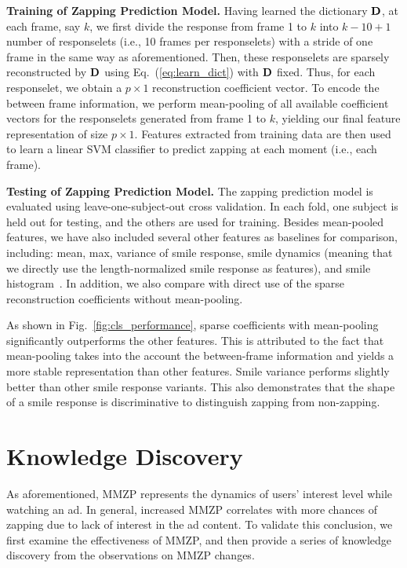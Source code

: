 \documentclass[twoside,leqno,twocolumn]{article}
\begin{document}
\noindent \textbf{Training of Zapping Prediction Model.} Having learned the dictionary ${\bf D}$, at each frame, say $k$, we first divide the response from frame 1 to $k$ into $k-10+1$ number of responselets (i.e., 10 frames per responselets) with a stride of one frame in the same way as aforementioned. Then, these responselets are sparsely reconstructed by ${\bf D}$ using Eq.~(\ref{eq:learn_dict}) with ${\bf D}$ fixed. Thus, for each responselet, we obtain a $p\times 1$ reconstruction coefficient vector. To encode the between frame information, we perform mean-pooling of all available coefficient vectors for the responselets generated from frame 1 to $k$, yielding our final feature representation of size $p\times 1$. Features extracted from training data are then used to learn a linear SVM classifier to predict zapping at each moment (i.e., each frame).

\noindent \textbf{Testing of Zapping Prediction Model.} The zapping prediction model is evaluated using leave-one-subject-out cross validation. In each fold, one subject is held out for testing, and the others are used for training. Besides mean-pooled features, we have also included several other features as baselines for comparison,  including: mean, max, variance of smile response, smile dynamics (meaning that we directly use the length-normalized smile response as features), and smile histogram~\cite{Yang_TAC14}. In addition, we also compare with direct use of the sparse reconstruction coefficients without mean-pooling.

As shown in Fig.~\ref{fig:cls_performance}, sparse coefficients with mean-pooling significantly outperforms the other features. This is attributed to the fact that mean-pooling takes into the account the between-frame information and yields a more stable representation than other features. Smile variance performs slightly better than other smile response variants. This also demonstrates that the shape of a smile response is discriminative to distinguish zapping from non-zapping. 



\section{Knowledge Discovery}

As aforementioned, MMZP represents the dynamics of users' interest level while watching an ad. In general, increased MMZP correlates with more chances of zapping due to lack of interest in the ad content. To validate this conclusion, we first examine the effectiveness of MMZP, and then provide a series of knowledge discovery from the observations on MMZP changes. 
\end{document}
